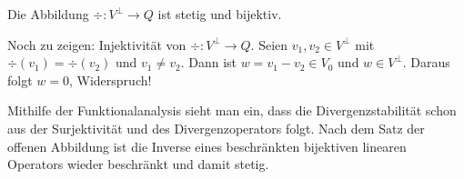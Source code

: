 \begin{lemma}Die Abbildung $\div: V^{\perp} \to Q$ ist stetig und bijektiv.
\end{lemma}
\begin{beweis}
  Noch zu zeigen: Injektivität von $\div: V^{\perp} \to Q$. Seien $v_{1}, v_{2} \in V^{\perp}$ mit $\div(v_{1}) = \div(v_{2})$ und $v_{1} \neq v_{2}$. Dann ist $w = v_{1}- v_{2} \in V_{0}$ und $w \in V^{\perp}$. Daraus folgt $w = 0$, Widerspruch! 
\end{beweis}
\begin{bemerkung}
  Mithilfe der Funktionalanalysis sieht man ein, dass die Divergenzstabilität schon aus der Surjektivität und des Divergenzoperators folgt. Nach dem Satz der offenen Abbildung ist die Inverse eines beschränkten bijektiven linearen Operators wieder beschränkt und damit stetig. 
\end{bemerkung} 